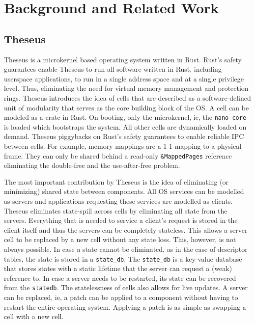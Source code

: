 
\chapter{Background and Related Work}

\label{Chapter2}



\section{Theseus}
Theseus\cite{theseus} is a microkernel based operating system written in Rust. Rust's safety guarantees enable Theseus to run all software written in Rust, including userspace applications, to run in a single address space and at a single privilege level. Thus, eliminating the need for virtual memory management and protection rings. Theseus introduces the idea of cells that are described as a software-defined unit of modularity that serves as the core building block of the OS. A cell can be modeled as a crate in Rust. On booting, only the microkernel, ie, the \lstinline{nano_core} is loaded which bootstraps the system. All other cells are dynamically loaded on demand. 
Theseus piggybacks on Rust's safety guarantees to enable reliable IPC between cells. For example, memory mappings are a 1-1 mapping to a physical frame. They can only be shared behind a read-only \lstinline{&MappedPages} reference eliminating the double-free and the use-after-free problem. 

The most important contribution by Theseus is the idea of eliminating (or minimizing) shared state between components. All OS services can be modelled as servers and applications requesting these services are modelled as clients. Theseus eliminates state-spill\cite{state-spill} across cells by eliminating all state from the servers. Everything that is needed to service a client's request is stored in the client itself and thus the servers can be completely stateless. This allows a server cell to be replaced by a new cell without any state loss. This, however, is not always possible. In case a state cannot be eliminated, as in the case of descriptor tables, the state is stored in a \lstinline{state_db}. The \lstinline{state_db} is a key-value database that stores states with a static lifetime that the server can request a (weak) reference to. In case a server needs to be restarted, its state can be recovered from the \lstinline{statedb}. The statelessness of cells also allows for live updates. A server can be replaced, ie, a patch can be applied to a component without having to restart the entire operating system. Applying a patch is as simple as swapping a cell with a new cell.


